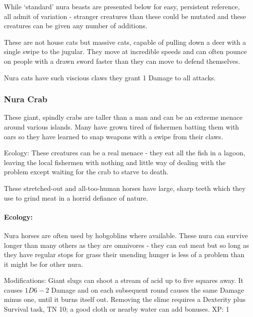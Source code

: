 	While `standard' nura beasts are presented below for easy, persistent reference, all admit of variation - stranger creatures than these could be mutated and these creatures can be given any number of additions.

\label{nura_cat}
\nuracat

These are not house cats but massive cats, capable of pulling down a deer with a single swipe to the jugular.  They move at incredible speeds and can often pounce on people with a drawn sword faster than they can move to defend themselves.

Nura cats have such viscious claws they grant 1 Damage to all attacks.

\subsubsection{Nura Crab}\label{nura_crab}
\nuracrab

These giant, spindly crabs are taller than a man and can be an extreme menace around various islands.  Many have grown tired of fishermen batting them with oars so they have learned to snap weapons with a swipe from their claws.

Ecology: These creatures can be a real menace - they eat all the fish in a lagoon, leaving the local fishermen with nothing and little way of dealing with the problem except waiting for the crab to starve to death.


\label{nura_horse}
\nurahorse

These stretched-out and all-too-human horses have large, sharp teeth which they use to grind meat in a horrid defiance of nature.

\paragraph{Ecology:} Nura horses are often used by hobgoblins where available.  These nura can survive longer than many others as they are omnivores - they can eat meat but so long as they have regular stops for grass their unending hunger is less of a problem than it might be for other nura.

\label{nura_slug}
\nuraslug

Modifications: Giant slugs can shoot a stream of acid up to five squares away.  It causes $1D6-2$ Damage and on each subsequent round causes the same Damage minus one, until it burns itself out.  Removing the slime requires a Dexterity plus Survival task, TN 10; a good cloth or nearby water can add bonuses. XP: 1

